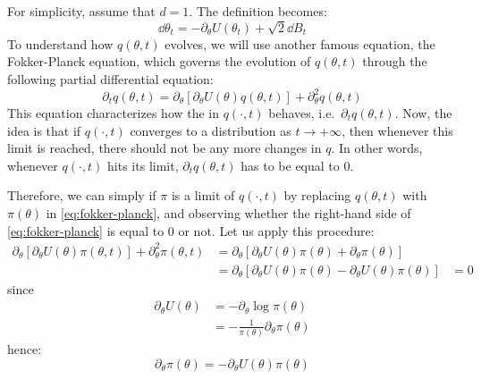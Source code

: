 \documentclass[toc, titlepaged]{../cs-classes/cs-classes}
\begin{document}
For simplicity, assume that $d=1$. The definition becomes:
\begin{equation*}
    \dd\theta_t=-\partial_\theta U(\theta_t)+\sqrt{2}\dd B_t
\end{equation*}
To understand how $q(\theta, t)$ evolves, we will use another famous equation, the Fokker-Planck equation, which governs the evolution of $q(\theta, t)$ through the following partial differential equation:
\begin{equation}
    \label{eq:fokker-planck} 
    \partial_t q(\theta, t)=\partial_\theta\left[\partial_\theta U(\theta)q(\theta, t)\right]+\partial^2_\theta q(\theta, t)
\end{equation}
This equation characterizes how the  in $q(\cdot, t)$ behaves, i.e.~$\partial_t q(\theta, t)$. Now, the idea is that if $q(\cdot, t)$ converges to a distribution as $t\to+\infty$, then whenever this limit is reached, there should not be any more changes in $q$. In other words, whenever $q(\cdot, t)$ hits its limit, $\partial_t q(\theta, t)$ has to be equal to 0.

Therefore, we can simply  if $\pi$ is a limit of $q(\cdot, t)$ by replacing $q(\theta, t)$ with $\pi(\theta)$ in \eqref{eq:fokker-planck}, and observing whether the right-hand side of \eqref{eq:fokker-planck} is equal to 0 or not. Let us apply this procedure:
\begin{equation*}
    \begin{aligned}
        \partial_\theta\left[\partial_\theta U(\theta)\pi(\theta, t)\right]+\partial^2_\theta\pi(\theta, t) &= \partial_\theta[\partial_\theta U(\theta)\pi(\theta)+\partial_\theta\pi(\theta)]\\
        &= \partial_\theta[\partial_\theta U(\theta)\pi(\theta)-\partial_\theta U(\theta)\pi(\theta)]
        &= 0
    \end{aligned}
\end{equation*}
since
\begin{equation*}
    \begin{aligned}
        \partial_\theta U(\theta) &= -\partial_\theta\log\pi(\theta)\\
        &= -\frac{1}{\pi(\theta)}\partial_\theta\pi(\theta)
    \end{aligned}
\end{equation*}
hence:
\begin{equation*}
    \partial_\theta\pi(\theta) = -\partial_\theta U(\theta)\pi(\theta)
\end{equation*}
\end{document}
